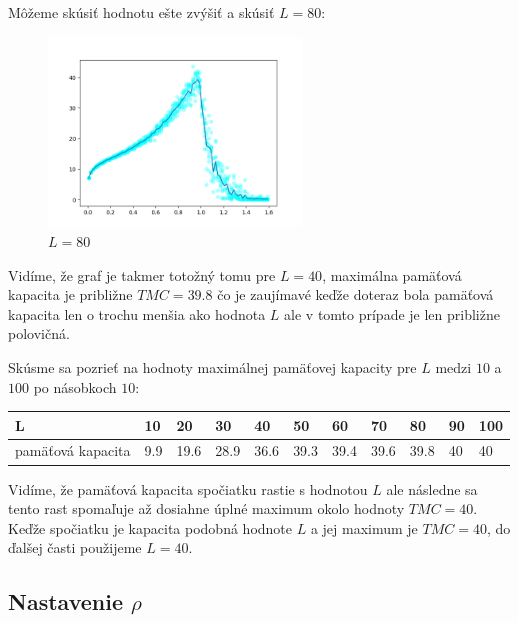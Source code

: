 \documentclass[a4paper]{article}
\begin{document}
	Môžeme skúsiť hodnotu ešte zvýšiť a skúsiť $L=80$:
	
	\begin{figure}[!h]
		\centering
		\includegraphics[width=0.6\textwidth]{../L_80.png}
		\caption{$L=80$}
	\end{figure}
	
	Vidíme, že graf je takmer totožný tomu pre $L=40$, maximálna pamäťová kapacita je približne $TMC=39.8$ čo je zaujímavé keďže doteraz bola pamäťová kapacita len o trochu menšia ako hodnota $L$ ale v tomto prípade je len približne polovičná. 
	\newpage
	
	Skúsme sa pozrieť na hodnoty maximálnej pamäťovej kapacity pre $L$ medzi $10$ a $100$ po násobkoch $10$:
	
	\begin{table}[!h]
		\begin{tabular}{|p{}|p{}|p{}|p{}|p{}|p{}|p{}|p{}|p{}|p{}|p{}|}
			\hline
			L& 10& 20& 30& 40& 50& 60& 70& 80& 90& 100 \\ \hline
			pamäťová kapacita & 9.9& 19.6& 28.9& 36.6& 39.3& 39.4& 39.6& 39.8& 40& 40\\ \hline
		\end{tabular}
	\end{table}
	
	Vidíme, že pamäťová kapacita spočiatku rastie s hodnotou $L$ ale následne sa tento rast spomaľuje až dosiahne úplné maximum okolo hodnoty $TMC=40$. Keďže spočiatku je kapacita podobná hodnote $L$ a jej maximum je $TMC=40$, do ďalšej časti použijeme $L=40$.
	
	\subsection*{Nastavenie $\rho$}
	
\end{document}
